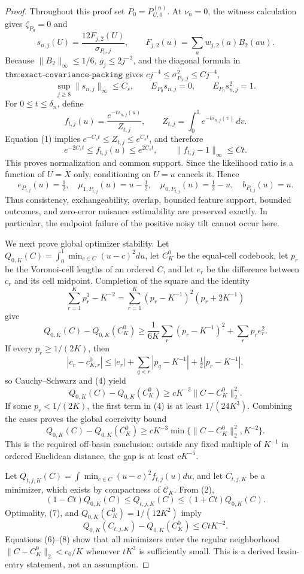 \documentclass{article}
\begin{document}
\begin{proof}
Throughout this proof set \(P_0=P_{U,0}^{(n)}\).  At \(\nu_n=0\), the witness calculation gives \(\zeta_{P_0}=0\) and
\[
 s_{n,j}(U)=\frac{12F_{j,2}(U)}{\sigma_{P_0,j}},\qquad
 F_{j,2}(u)=\sum_aw_{j,2}(a)B_2(au).
\]
Because \(\|B_2\|_\infty\leq1/6\), \(g_j\leq2j^{-3}\), and the diagonal formula in \(\texttt{thm:exact-covariance-packing}\) gives \(c j^{-4}\leq\sigma_{P_0,j}^2\leq Cj^{-4}\),
\[
 \sup_{j\geq8}\|s_{n,j}\|_\infty\leq C_s,\qquad
 E_{P_0}s_{n,j}=0,\qquad E_{P_0}s_{n,j}^2=1. \tag{1}
\]
For \(0\leq t\leq\delta_n\), define
\[
 f_{t,j}(u)=\frac{e^{-t s_{n,j}(u)}}{Z_{t,j}},\qquad
 Z_{t,j}=\int_0^1e^{-t s_{n,j}(v)}\,dv.
\]
Equation (1) implies \(e^{-C_st}\leq Z_{t,j}\leq e^{C_st}\), and therefore
\[
 e^{-2C_st}\leq f_{t,j}(u)\leq e^{2C_st},\qquad
 \|f_{t,j}-1\|_\infty\leq C t. \tag{2}
\]
This proves normalization and common support.  Since the likelihood ratio is a function of \(U=X\) only, conditioning on \(U=u\) cancels it.  Hence
\[
 e_{P_{t,j}}(u)=\tfrac12,\quad
 \mu_{1,P_{t,j}}(u)=u-\tfrac12,\quad
 \mu_{0,P_{t,j}}(u)=\tfrac12-u,\quad b_{P_{t,j}}(u)=u. \tag{3}
\]
Thus consistency, exchangeability, overlap, bounded feature support, bounded outcomes, and zero-error nuisance estimability are preserved exactly.  In particular, the endpoint failure of the positive noisy tilt cannot occur here.

We next prove global optimizer stability.  Let \(Q_{0,K}(C)=\int_0^1\min_{c\in C}(u-c)^2du\), let \(C_K^0\) be the equal-cell codebook, let \(p_r\) be the Voronoi-cell lengths of an ordered \(C\), and let \(e_r\) be the difference between \(c_r\) and its cell midpoint.  Completion of the square and the identity
\[
 \sum_{r=1}^Kp_r^3-K^{-2}
 =\sum_{r=1}^K(p_r-K^{-1})^2(p_r+2K^{-1})
\]
give
\[
 Q_{0,K}(C)-Q_{0,K}(C_K^0)
 \geq\frac1{6K}\sum_r(p_r-K^{-1})^2+\sum_rp_re_r^2. \tag{4}
\]
If every \(p_r\geq1/(2K)\), then
\[
 |c_r-c_{K,r}^0|
 \leq |e_r|+\sum_{q<r}|p_q-K^{-1}|+\tfrac12|p_r-K^{-1}|,
\]
so Cauchy--Schwarz and (4) yield
\[
 Q_{0,K}(C)-Q_{0,K}(C_K^0)\geq cK^{-3}\|C-C_K^0\|_2^2. \tag{5}
\]
If some \(p_r<1/(2K)\), the first term in (4) is at least \(1/(24K^3)\).  Combining the cases proves the global coercivity bound
\[
 Q_{0,K}(C)-Q_{0,K}(C_K^0)
 \geq cK^{-3}\min\{\|C-C_K^0\|_2^2,K^{-2}\}. \tag{6}
\]
This is the required off-basin conclusion: outside any fixed multiple of \(K^{-1}\) in ordered Euclidean distance, the gap is at least \(cK^{-5}\).

Let \(Q_{t,j,K}(C)=\int\min_{c\in C}(u-c)^2f_{t,j}(u)du\), and let \(C_{t,j,K}\) be a minimizer, which exists by compactness of \(\mathcal C_K\).  From (2),
\[
 (1-Ct)Q_{0,K}(C)\leq Q_{t,j,K}(C)\leq(1+Ct)Q_{0,K}(C). \tag{7}
\]
Optimality, (7), and \(Q_{0,K}(C_K^0)=1/(12K^2)\) imply
\[
 Q_{0,K}(C_{t,j,K})-Q_{0,K}(C_K^0)\leq CtK^{-2}. \tag{8}
\]
Equations (6)--(8) show that all minimizers enter the regular neighborhood \(\|C-C_K^0\|_2<c_0/K\) whenever \(tK^3\) is sufficiently small.  This is a derived basin-entry statement, not an assumption.


\end{proof}
\end{document}
